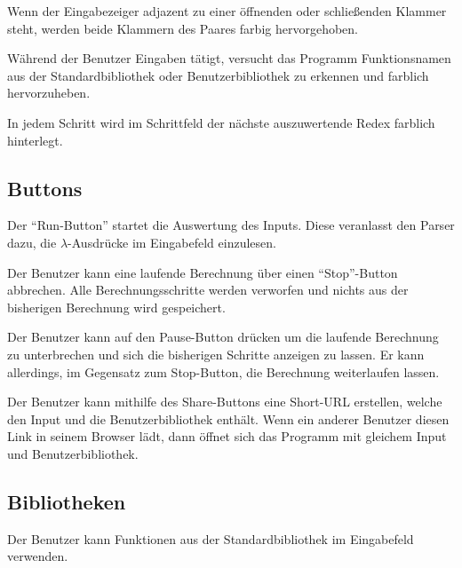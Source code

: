 \documentclass[parskip=full,11pt,twoside]{scrartcl}
\begin{document}
Wenn der Eingabezeiger adjazent zu einer öffnenden oder schließenden Klammer steht, werden beide Klammern des Paares farbig hervorgehoben.

Während der Benutzer Eingaben tätigt, versucht das Programm Funktionsnamen aus der Standardbibliothek oder Benutzerbibliothek zu erkennen und farblich hervorzuheben.

In jedem Schritt wird im Schrittfeld der nächste auszuwertende Redex farblich hinterlegt.




\subsection{Buttons}

Der \enquote{Run-Button} startet die Auswertung des Inputs. Diese veranlasst den Parser dazu, die $\lambda$-Ausdrücke im Eingabefeld einzulesen.

Der Benutzer kann eine laufende Berechnung über einen \enquote{Stop}-Button abbrechen. Alle Berechnungsschritte werden verworfen und nichts aus der bisherigen Berechnung wird gespeichert.

Der Benutzer kann auf den Pause-Button drücken um die laufende Berechnung zu unterbrechen und sich die bisherigen Schritte anzeigen zu lassen. Er kann allerdings, im Gegensatz zum Stop-Button, die Berechnung weiterlaufen lassen.

Der Benutzer kann mithilfe des Share-Buttons eine Short-URL erstellen, welche den Input und die Benutzerbibliothek enthält. Wenn ein anderer Benutzer diesen Link in seinem Browser lädt, dann öffnet sich das Programm mit gleichem Input und Benutzerbibliothek.



\subsection{Bibliotheken}

Der Benutzer kann Funktionen aus der Standardbibliothek im Eingabefeld verwenden.
\end{document}
